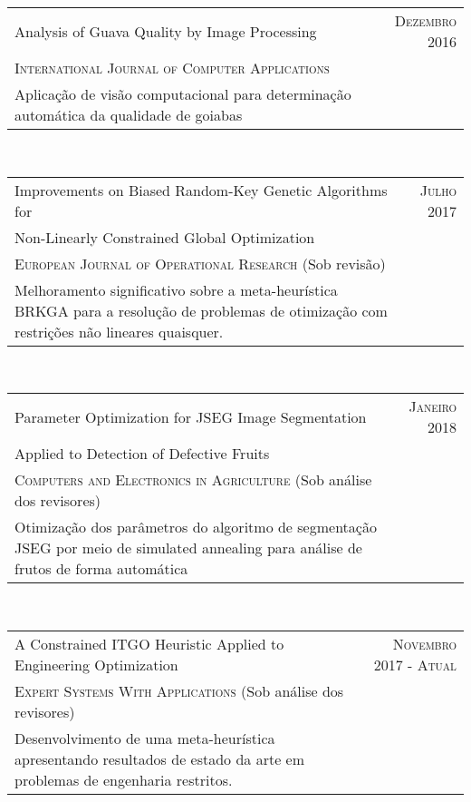 \documentclass[a4paper,10pt]{article}
\begin{document}
\begin{tabular}{p{11cm}|r}
  Analysis of Guava Quality by Image Processing & \textsc{Dezembro 2016} \\
  \textsc{International Journal of Computer Applications} & \\
  \footnotesize{Aplicação de visão computacional para determinação automática da qualidade de goiabas} & \\
\end{tabular}\\

\begin{tabular}{p{11cm}|r}
  Improvements on Biased Random-Key Genetic Algorithms for & \textsc{Julho 2017} \\
  Non-Linearly Constrained Global Optimization & \\
  \textsc{European Journal of Operational Research} (Sob revisão) & \\
  \footnotesize{Melhoramento significativo sobre a meta-heurística BRKGA para a resolução de problemas de otimização com restrições não lineares quaisquer.} & \\
\end{tabular}\\

\begin{tabular}{p{11cm}|r}
  Parameter Optimization for JSEG Image Segmentation & \textsc{Janeiro 2018} \\
  Applied to Detection of Defective Fruits & \\
  \textsc{Computers and Electronics in Agriculture} (Sob análise dos revisores) & \\
  \footnotesize{Otimização dos parâmetros do algoritmo de segmentação JSEG por meio de simulated annealing para análise de frutos de forma automática} & \\
\end{tabular}\\

\begin{tabular}{p{11cm}|r}
  A Constrained ITGO Heuristic Applied to Engineering Optimization & \textsc{Novembro 2017 - Atual} \\
  \textsc{Expert Systems With Applications} (Sob análise dos revisores) & \\
  \footnotesize{Desenvolvimento de uma meta-heurística apresentando resultados de estado da arte em problemas de engenharia restritos.} & \\
\end{tabular}\\
\end{document}
